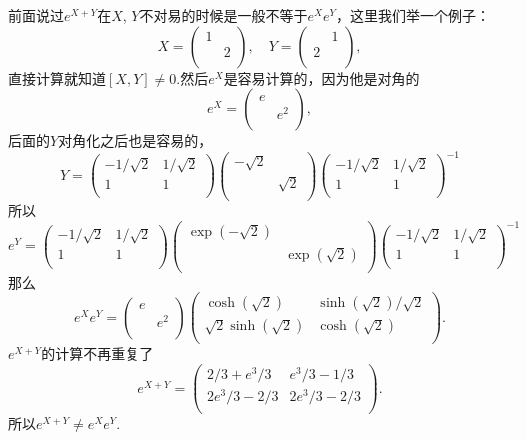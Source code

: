 前面说过$e^{X+Y}$在$X$, $Y$不对易的时候是一般不等于$e^Xe^Y$，这里我们举一个例子：
\[
X=\begin{pmatrix}
1&\\
&2\\
\end{pmatrix},
\quad
Y=\begin{pmatrix}
&1\\
2&\\
\end{pmatrix},
\]
直接计算就知道$[X,Y]\neq 0$.然后$e^X$是容易计算的，因为他是对角的
\[
e^X=\begin{pmatrix}
e&\\
&e^2\\
\end{pmatrix},
\]
后面的$Y$对角化之后也是容易的，
\[
Y=
\begin{pmatrix}
 -1/\sqrt{2} & 1/\sqrt{2} \\
 1 & 1 \\
\end{pmatrix}
\begin{pmatrix}
 -\sqrt{2} &  \\
  & \sqrt{2} \\
\end{pmatrix}
\begin{pmatrix}
 -1/\sqrt{2} & 1/\sqrt{2} \\
 1 & 1 \\
\end{pmatrix}^{-1}
\]
所以
\[
e^Y=
\begin{pmatrix}
 -1/\sqrt{2} & 1/\sqrt{2} \\
 1 & 1 \\
\end{pmatrix}
\begin{pmatrix}
 \exp(-\sqrt{2}) &  \\
  & \exp(\sqrt{2}) \\
\end{pmatrix}
\begin{pmatrix}
 -1/\sqrt{2} & 1/\sqrt{2} \\
 1 & 1 \\
\end{pmatrix}^{-1}
\]
那么
\[
e^Xe^Y=
\begin{pmatrix}
e&\\
&e^2\\
\end{pmatrix}
\begin{pmatrix}
\cosh \left(\sqrt{2}\right)&\sinh \left(\sqrt{2}\right)/\sqrt{2}\\
\sqrt{2} \sinh \left(\sqrt{2}\right)&\cosh \left(\sqrt{2}\right)\\
\end{pmatrix}.
\]
$e^{X+Y}$的计算不再重复了
\[
e^{X+Y}=\begin{pmatrix}
 2/3+e^3/3 & e^3/3-1/3 \\
 2 e^3/3-2/3 & 2 e^3/3-2/3 \\
\end{pmatrix}.
\]
所以$e^{X+Y}\neq e^Xe^Y$.

